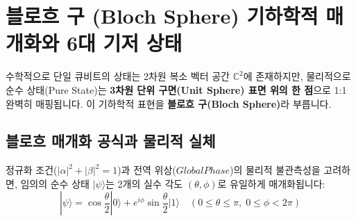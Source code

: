 \documentclass[11pt, a4paper]{article}
\newcommand{\ket}[1]{|#1\rangle}
\theoremstyle{definition}
\begin{document}
\section{블로흐 구 (Bloch Sphere) 기하학적 매개화와 6대 기저 상태}
수학적으로 단일 큐비트의 상태는 2차원 복소 벡터 공간 $\mathbb{C}^2$에 존재하지만, 물리적으로 순수 상태(Pure State)는 \textbf{3차원 단위 구면(Unit Sphere) 표면 위의 한 점}으로 1:1 완벽히 매핑됩니다. 이 기하학적 표현을 \textbf{블로흐 구(Bloch Sphere)}라 부릅니다.

\subsection{블로흐 매개화 공식과 물리적 실체}
정규화 조건($|\alpha|^2 + |\beta|^2 = 1$)과 전역 위상($Global Phase$)의 물리적 불관측성을 고려하면, 임의의 순수 상태 $\ket{\psi}$는 2개의 실수 각도 $(\theta, \phi)$로 유일하게 매개화됩니다:
$$\ket{\psi} = \cos\frac{\theta}{2}\ket{0} + e^{i\phi}\sin\frac{\theta}{2}\ket{1} \quad (0 \le \theta \le \pi, \; 0 \le \phi < 2\pi)$$
\end{document}
